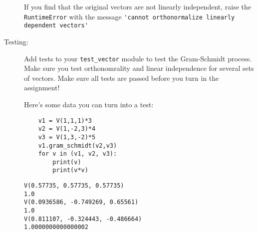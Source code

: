 \documentclass[12pt]{article}
\begin{document}
\begin{description}
If you find that the original vectors are not
linearly independent, raise the \lstinline{RuntimeError}
with the message 
\lstinline{'cannot orthonormalize linearly dependent vectors'}

\item[Testing:] 
Add tests to your \lstinline{test_vector}
module to test the Gram-Schmidt process.  Make
sure you test orthonomrality and linear 
independence for several sets of vectors. Make sure all
tests are passed before
you turn in the assignment!

Here's some data you can turn into a test:
\begin{lstlisting}
    v1 = V(1,1,1)*3
    v2 = V(1,-2,3)*4
    v3 = V(1,3,-2)*5
    v1.gram_schmidt(v2,v3)
    for v in (v1, v2, v3):
        print(v)
        print(v*v)
\end{lstlisting}
\begin{lstlisting}
V(0.57735, 0.57735, 0.57735)
1.0
V(0.0936586, -0.749269, 0.65561)
1.0
V(0.811107, -0.324443, -0.486664)
1.0000000000000002
\end{lstlisting}

\end{description}
\end{document}
